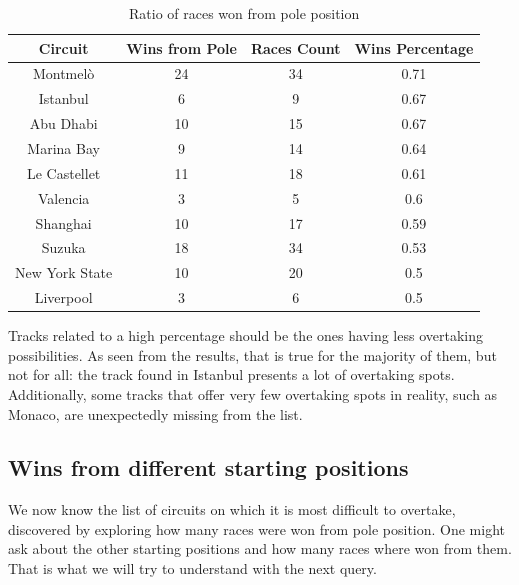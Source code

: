 \documentclass{Configuration_Files/PoliMi3i_thesis}
\begin{document}
\vspace{0.5cm}
\inputminted[frame=single,framesep=10pt,breaklines]{python}{formula1/queries/query3.py}

\newpage
\begin{table}[!h]
    \centering
    \begin{tabular}{|c|c|c|c|}
        \hline
        \textbf{Circuit} & \textbf{Wins from Pole} & \textbf{Races Count} & \textbf{Wins Percentage} \\
        \hline
        Montmelò & 24 & 34 & 0.71 \\
        Istanbul & 6 & 9 & 0.67 \\
        Abu Dhabi & 10 & 15 & 0.67 \\
        Marina Bay & 9 & 14 & 0.64 \\
        Le Castellet & 11 & 18 & 0.61 \\
        Valencia & 3 & 5 & 0.6 \\
        Shanghai & 10 & 17 & 0.59 \\
        Suzuka & 18 & 34 & 0.53 \\
        New York State & 10 & 20 & 0.5 \\
        Liverpool & 3 & 6 & 0.5 \\
        \hline
    \end{tabular}
    \caption{Ratio of races won from pole position}
\end{table}

Tracks related to a high percentage should be the ones having less overtaking possibilities. As seen from the results, that is true for the majority of them, but not for all: the track found in Istanbul presents a lot of overtaking spots. Additionally, some tracks that offer very few overtaking spots in reality, such as Monaco, are unexpectedly missing from the list.

\subsection{Wins from different starting positions}
We now know the list of circuits on which it is most difficult to overtake, discovered by exploring how many races were won from pole position. One might ask about the other starting positions and how many races where won from them. That is what we will try to understand with the next query.

\vspace{0.5cm}
\inputminted[frame=single,framesep=10pt,breaklines]{python}{formula1/queries/query4.py}
\end{document}
